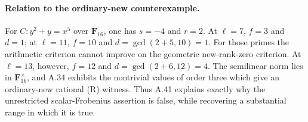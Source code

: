 \documentclass[11pt]{article}
\begin{document}
\paragraph{Relation to the ordinary-new counterexample.}
For \(C:y^2+y=x^5\) over \(\mathbf F_{16}\), one has
\(s=-4\) and \(r=2\). At \(\ell=7\), \(f=3\) and
\(d=1\); at \(\ell=11\), \(f=10\) and
\(d=\gcd(2+5,10)=1\). For those primes the arithmetic
criterion cannot improve on the geometric new-rank-zero
criterion. At \(\ell=13\), however, \(f=12\) and
\(d=\gcd(2+6,12)=4\). The semilinear norm lies in
\(\mathbf F_{16}^\times\), and A.34 exhibits the
nontrivial values of order three which give an ordinary-new
rational (R) witness. Thus A.41 explains exactly why
the unrestricted scalar-Frobenius assertion is false,
while recovering a substantial range in which it is true.
\end{document}
